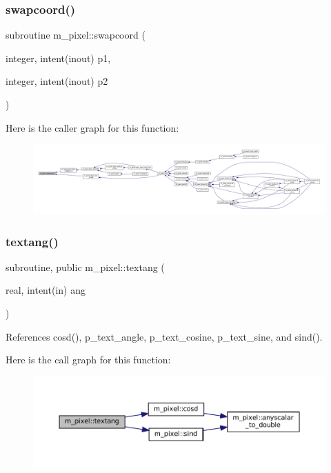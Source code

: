 \subsubsection{\texorpdfstring{swapcoord()}{swapcoord()}}
{\footnotesize\ttfamily subroutine m\+\_\+pixel\+::swapcoord (\begin{DoxyParamCaption}\item[{integer, intent(inout)}]{p1,  }\item[{integer, intent(inout)}]{p2 }\end{DoxyParamCaption})\hspace{0.3cm}{\ttfamily [private]}}

Here is the caller graph for this function\+:
\nopagebreak
\begin{figure}[H]
\begin{center}
\leavevmode
\includegraphics[width=350pt]{namespacem__pixel_a063f74c3dd2f7f086dc47ec68abc22c9_icgraph}
\end{center}
\end{figure}
\mbox{\label{namespacem__pixel_a5e213461e9894b99c9e8f278d5c4a858}} 
\subsubsection{\texorpdfstring{textang()}{textang()}}
{\footnotesize\ttfamily subroutine, public m\+\_\+pixel\+::textang (\begin{DoxyParamCaption}\item[{real, intent(in)}]{ang }\end{DoxyParamCaption})}



References cosd(), p\+\_\+text\+\_\+angle, p\+\_\+text\+\_\+cosine, p\+\_\+text\+\_\+sine, and sind().

Here is the call graph for this function\+:
\nopagebreak
\begin{figure}[H]
\begin{center}
\leavevmode
\includegraphics[width=350pt]{namespacem__pixel_a5e213461e9894b99c9e8f278d5c4a858_cgraph}
\end{center}
\end{figure}
\mbox{\label{namespacem__pixel_a070e9fff1f2cd0c89d40c5d3c72b7f2c}} 
